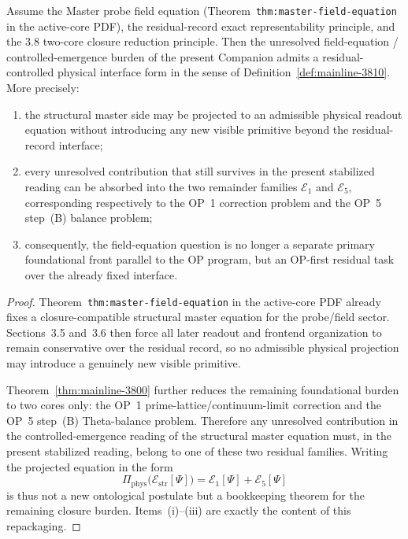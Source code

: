 \begin{theorem}
\label{thm:mainline-3810}
Assume the Master probe field equation (Theorem~\texttt{thm:master-field-equation} in the active-core PDF), the residual-record exact representability principle, and the 3.8 two-core closure reduction principle. Then the unresolved field-equation / controlled-emergence burden of the present Companion admits a residual-controlled physical interface form in the sense of Definition~\ref{def:mainline-3810}. More precisely:
\begin{enumerate}[label=(\roman*), leftmargin=2em]
  \item the structural master side may be projected to an admissible physical readout equation without introducing any new visible primitive beyond the residual-record interface;
  \item every unresolved contribution that still survives in the present stabilized reading can be absorbed into the two remainder families \(\mathcal E_{1}\) and \(\mathcal E_{5}\), corresponding respectively to the OP~1 correction problem and the OP~5 step~(B) balance problem;
  \item consequently, the field-equation question is no longer a separate primary foundational front parallel to the OP program, but an OP-first residual task over the already fixed interface.
\end{enumerate}
\end{theorem}

\begin{proof}
Theorem~\texttt{thm:master-field-equation} in the active-core PDF already fixes a closure-compatible structural master equation for the probe/field sector. Sections~3.5 and~3.6 then force all later readout and frontend organization to remain conservative over the residual record, so no admissible physical projection may introduce a genuinely new visible primitive.

Theorem~\ref{thm:mainline-3800} further reduces the remaining foundational burden to two cores only: the OP~1 prime-lattice/continuum-limit correction and the OP~5 step~(B) Theta-balance problem. Therefore any unresolved contribution in the controlled-emergence reading of the structural master equation must, in the present stabilized reading, belong to one of these two residual families. Writing the projected equation in the form
\[
  \Pi_{\mathrm{phys}}\bigl(\mathcal E_{\mathrm{str}}[\Psi]\bigr)
  =
  \mathcal E_{1}[\Psi]+\mathcal E_{5}[\Psi]
\]
is thus not a new ontological postulate but a bookkeeping theorem for the remaining closure burden. Items~(i)--(iii) are exactly the content of this repackaging.
\end{proof}


